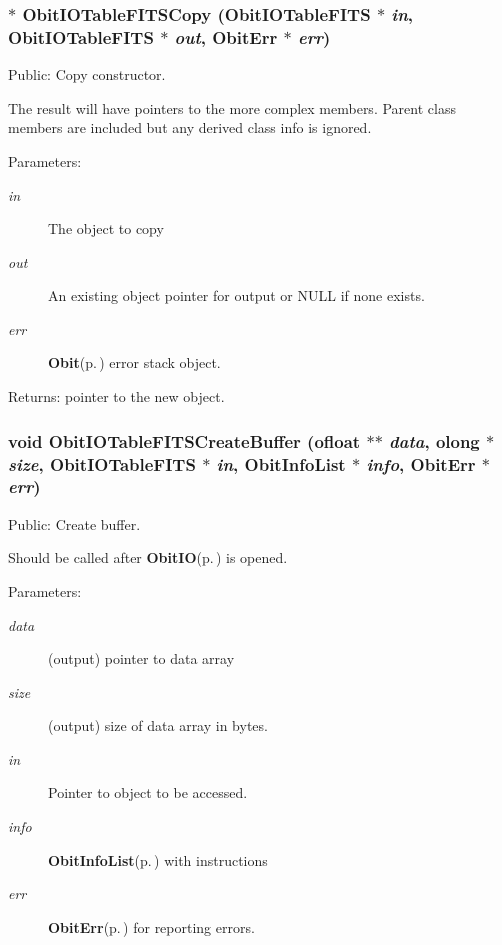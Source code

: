 \subsubsection{$\ast$ Obit\-IOTable\-FITSCopy ({\bf Obit\-IOTable\-FITS} $\ast$ {\em in}, {\bf Obit\-IOTable\-FITS} $\ast$ {\em out}, {\bf Obit\-Err} $\ast$ {\em err})}\label{ObitIOTableFITS_8h_a8}


Public: Copy constructor. 

The result will have pointers to the more complex members. Parent class members are included but any derived class info is ignored. \begin{Desc}
\item[Parameters:]
\begin{description}
\item[{\em in}]The object to copy \item[{\em out}]An existing object pointer for output or NULL if none exists. \item[{\em err}]{\bf Obit}{\rm (p.\,\pageref{structObit})} error stack object. \end{description}
\end{Desc}
\begin{Desc}
\item[Returns:]pointer to the new object. \end{Desc}
\subsubsection{\setlength{\rightskip}{0pt plus 5cm}void Obit\-IOTable\-FITSCreate\-Buffer ({\bf ofloat} $\ast$$\ast$ {\em data}, {\bf olong} $\ast$ {\em size}, {\bf Obit\-IOTable\-FITS} $\ast$ {\em in}, {\bf Obit\-Info\-List} $\ast$ {\em info}, {\bf Obit\-Err} $\ast$ {\em err})}\label{ObitIOTableFITS_8h_a19}


Public: Create buffer. 

Should be called after {\bf Obit\-IO}{\rm (p.\,\pageref{structObitIO})} is opened. \begin{Desc}
\item[Parameters:]
\begin{description}
\item[{\em data}](output) pointer to data array \item[{\em size}](output) size of data array in bytes. \item[{\em in}]Pointer to object to be accessed. \item[{\em info}]{\bf Obit\-Info\-List}{\rm (p.\,\pageref{structObitInfoList})} with instructions \item[{\em err}]{\bf Obit\-Err}{\rm (p.\,\pageref{structObitErr})} for reporting errors. \end{description}
\end{Desc}
